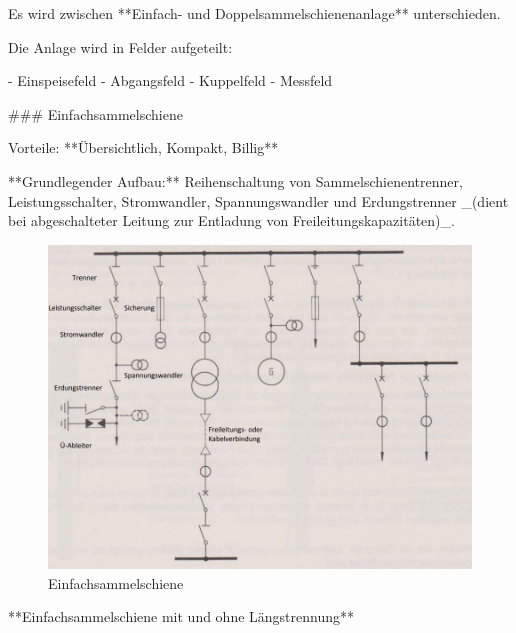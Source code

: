 \begin{markdown}
Es wird zwischen **Einfach- und Doppelsammelschienenanlage** unterschieden.

Die Anlage wird in Felder aufgeteilt:

- Einspeisefeld
- Abgangsfeld
- Kuppelfeld
- Messfeld

### Einfachsammelschiene

Vorteile: **Übersichtlich, Kompakt, Billig**

**Grundlegender Aufbau:** Reihenschaltung von Sammelschienentrenner, Leistungsschalter, Stromwandler, Spannungswandler und Erdungstrenner _(dient bei abgeschalteter Leitung zur Entladung von Freileitungskapazitäten)_.

\begin{figure}[H]
    \centering
    \includegraphics[width=0.9\linewidth]{./images/10-Schaltanlagen/Einfachsammelschiene-Aufbau.png}
    \caption[Einfachsammelschiene]{Einfachsammelschiene}
\end{figure}

**Einfachsammelschiene mit und ohne Längstrennung**

\end{markdown}

